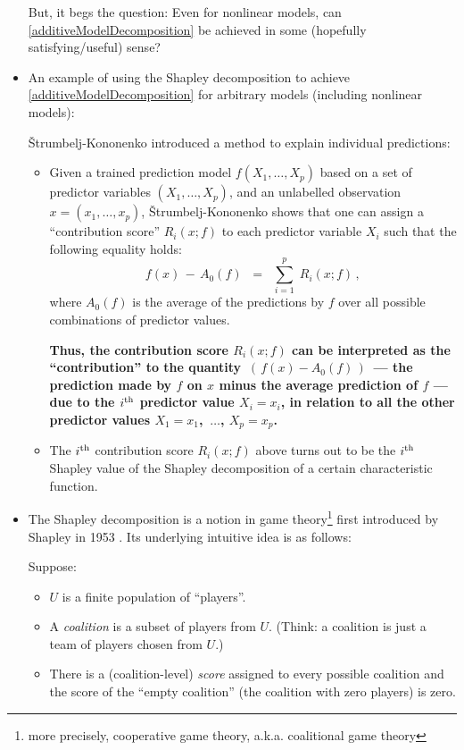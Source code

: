 \begin{itemize}
	But, it begs the question: Even for nonlinear models, can \eqref{additiveModelDecomposition}
	be achieved in some (hopefully satisfying/useful) sense?

\item
	An example of using the Shapley decomposition to achieve \eqref{additiveModelDecomposition}
	for arbitrary models (including nonlinear models):
	
	\v{S}trumbelj-Kononenko \cite{Strumbelj2010}
	introduced a method to {\color{red}explain individual predictions}:
	\begin{itemize}
	\item
		Given a trained prediction model $f(X_{1},\ldots,X_{p})$
		based on a set of predictor variables $(X_{1},\ldots,X_{p})$, and
		an unlabelled observation $x = (x_{1},\ldots,x_{p})$,
		\v{S}trumbelj-Kononenko \cite{Strumbelj2010} shows that
		one can assign a ``contribution score'' $R_{i}(x;f)$
		to each predictor variable $X_{i}$
		such that the following equality holds:
		\begin{equation*}
		f(x) \, - \, A_{0}(f)
		\;\; = \;\;
			\overset{p}{\underset{i=1}{\sum}}\;
			R_{i}(x;f)\,,
		\end{equation*}
		where $A_{0}(f)$ is the average of the predictions by $f$
		over all possible combinations of predictor values.

		\vskip 0.2cm
		\textbf{Thus, the contribution score $R_{i}(x;f)$ can be interpreted
		as the ``{\color{red}contribution}'' to the quantity \,$\left(\,f(x) - A_{0}(f)\,\right)$\,
		 --- the prediction made by $f$ on $x$ minus the average prediction of $f$ ---
		due to the $i^{\textnormal{th}}$ predictor value $X_{i} = x_{i}$,
		in relation to all the other predictor values
		$X_{1} = x_{1}$, \,$\ldots$\;, $X_{p} = x_{p}$.}
		\vskip 0.2cm
		
	\item
		The $i^{\textnormal{th}}$ contribution score $R_{i}(x;f)$ above
		turns out to be the $i^{\textnormal{th}}$ Shapley value of
		the Shapley decomposition of a certain characteristic function.
	\end{itemize}

\item
	The Shapley decomposition is a notion
	in game theory\footnote{more precisely, cooperative game theory, a.k.a. coalitional game theory}
	first introduced by Shapley in 1953 \cite{Shapley1953}.
	Its underlying intuitive idea is as follows:

	Suppose:
	\begin{itemize}
	\item
		$U$ is a finite population of ``players''.
	\item
		A \textit{coalition} is a subset of players from $U$.
		(Think: a coalition is just a team of players chosen from $U$.)
	\item
		There is a (coalition-level) \textit{score} assigned to every possible coalition
		and the score of the ``empty coalition'' (the coalition with zero players) is zero.
	\end{itemize}
	

\end{itemize}

